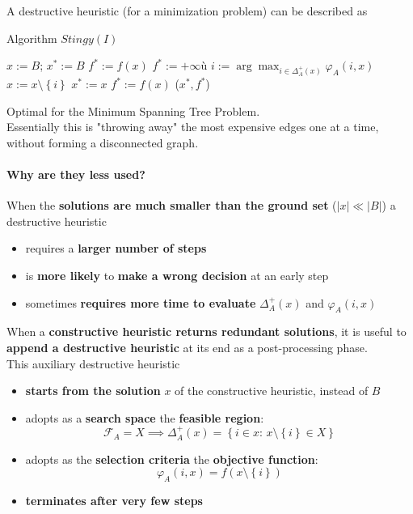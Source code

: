 A destructive heuristic (for a minimization problem) can be described as
\begin{algorithm}
	\caption{Algorithm $Stingy(I)$}
	\begin{algorithmic}
		\STATE $x := B$; $x^\ast := B$
		\STATE $f^\ast := f (x)$ 
		\ELSE 
		\STATE $f^\ast := + \infty$ù
		\ENDIF
		\STATE $i := \arg \max_{i \in \Delta_A^+ (x)} \varphi_A (i,x)$
		\STATE $x := x \setminus \left\{i\right\}$
		\STATE $x^\ast := x$
		\STATE $f^\ast := f(x)$
		\ENDIF
		\ENDWHILE
		\RETURN ($x^\ast, f^\ast$)
	\end{algorithmic}
\end{algorithm}
Optimal for the Minimum Spanning Tree Problem.\\

Essentially this is "throwing away" the most expensive edges one at a time, without forming a disconnected graph.\\

\newpage

\paragraph{Why are they less used?} When the \textbf{solutions are much smaller than the ground set} ($|x| \ll |B|$) a destructive heuristic
\begin{itemize}
	\item requires a \textbf{larger number of steps}
	
	\item is \textbf{more likely} to \textbf{make a wrong decision} at an early step
	
	\item sometimes \textbf{requires more time to evaluate} $\Delta_A^+ (x)$ and $\varphi_A (i, x)$
\end{itemize}

When a \textbf{constructive heuristic returns redundant solutions}, it is useful to \textbf{append a destructive heuristic} at its end as a post-processing phase.\\

This auxiliary destructive heuristic
\begin{itemize}
	\item \textbf{starts from the solution} $x$ of the constructive heuristic, instead of $B$
	
	\item adopts as a \textbf{search space} the \textbf{feasible region}:
	$$ \mathcal{F}_A = X \implies \Delta_A^+ (x) = \left\{ i \in x : \, x \setminus \left\{i\right\} \in X \right\} $$
	
	\item adopts as the \textbf{selection criteria} the \textbf{objective function}:
	$$ \varphi_A (i,x) = f (x \setminus \left\{i\right\}) $$
	
	\item \textbf{terminates after very few steps}
\end{itemize}

